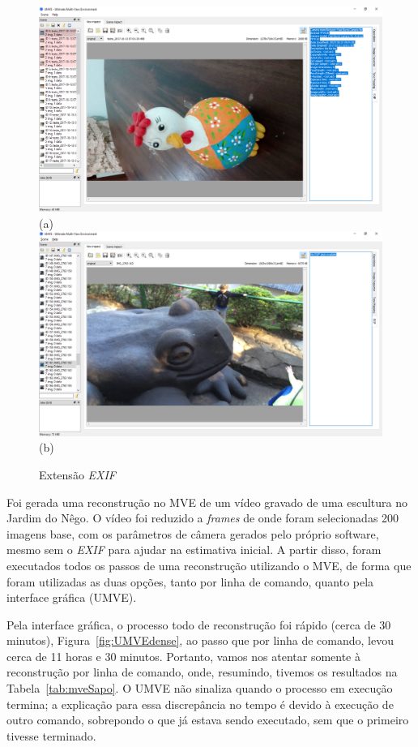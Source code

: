 \begin{figure}[!h]
	\centering
	\caption{Extensão \emph{EXIF}}
	\includegraphics[width=0.461\linewidth]{figs/exifumve.png}(a)
	\includegraphics[width=0.461\linewidth]{figs/exifsemumve.png}(b)
	\label{fig:mveexif}
\end{figure} 

Foi gerada uma reconstrução no MVE de um vídeo gravado de uma escultura no Jardim do
Nêgo. O  vídeo foi reduzido a \emph{frames} de onde foram selecionadas 200 imagens base,
com os parâmetros de câmera gerados pelo próprio software, mesmo sem o
\emph{EXIF} para ajudar na estimativa inicial. 
A partir disso, foram executados todos os passos de uma reconstrução utilizando o
MVE, de forma que foram utilizadas as duas opções, tanto por linha de comando,
quanto pela interface gráfica (UMVE).

Pela interface gráfica, o processo todo de reconstrução foi rápido (cerca de 30
minutos), Figura~\ref{fig:UMVEdense}, ao passo que por linha de comando, levou cerca de
11 horas e 30 minutos. Portanto, vamos nos atentar somente à reconstrução por
linha de comando, onde, resumindo, tivemos os resultados na Tabela~\ref{tab:mveSapo}. 
O UMVE não sinaliza quando o processo em execução termina; a explicação
para essa discrepância no tempo é devido à execução de outro comando, sobrepondo
o que já estava sendo executado, sem que o primeiro tivesse terminado.


